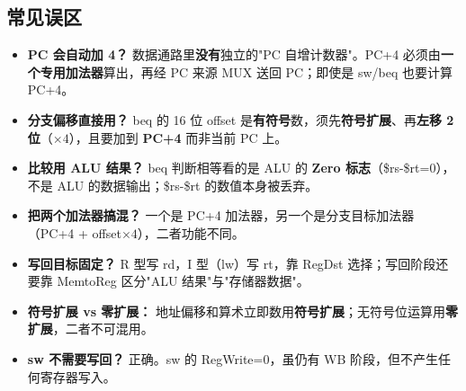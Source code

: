 \subsection{常见误区}

\begin{itemize}
    \item \textbf{PC 会自动加 4？} 数据通路里\textbf{没有}独立的"PC 自增计数器"。PC+4 必须由\textbf{一个专用加法器}算出，再经 PC 来源 MUX 送回 PC；即使是 sw/beq 也要计算 PC+4。
    \item \textbf{分支偏移直接用？} beq 的 16 位 offset 是\textbf{有符号}数，须先\textbf{符号扩展}、再\textbf{左移 2 位}（$\times 4$），且要加到 \textbf{PC+4} 而非当前 PC 上。
    \item \textbf{比较用 ALU 结果？} beq 判断相等看的是 ALU 的 \textbf{Zero 标志}（\$rs-\$rt=0），不是 ALU 的数据输出；\$rs-\$rt 的数值本身被丢弃。
    \item \textbf{把两个加法器搞混？} 一个是 PC+4 加法器，另一个是分支目标加法器（PC+4 + offset$\times4$），二者功能不同。
    \item \textbf{写回目标固定？} R 型写 rd，I 型（lw）写 rt，靠 RegDst 选择；写回阶段还要靠 MemtoReg 区分"ALU 结果"与"存储器数据"。
    \item \textbf{符号扩展 vs 零扩展：} 地址偏移和算术立即数用\textbf{符号扩展}；无符号位运算用\textbf{零扩展}，二者不可混用。
    \item \textbf{sw 不需要写回？} 正确。sw 的 RegWrite=0，虽仍有 WB 阶段，但不产生任何寄存器写入。
\end{itemize}
